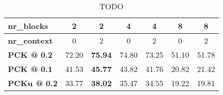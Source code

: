 \begin{table}[]
    \small
    \centering
    \caption{Per joint accuracy w.r.t. PCK @ 0.1, computed on the JHMDB test set using $4$ prediction blocks and $0$ context heatmaps. In addition, aggregated accuracy values are given in the third row for different sets of joints. \textit{Arms} for both left and right are computed by taking the average of the shoulder, elbow and wrist accuracies. \textit{Legs} are computed the same way, using knee, ankle and hip accuracy values. For \textit{Upper body}, upper neck and head top are added to both \textit{Arms} aggregations. \textit{Lower body} is computed by aggregating both \textit{legs} accuracies as well as pelvis.}
    \label{tab:jhmdb-perjoint}
\end{table}

\begin{table}[]
    \small
    \centering
    \begin{tabular}{|l|c|c|c|c|c|c|}
    \hline
        \textbf{nr\_blocks} & 2 & 2 & 4 & 4 & 8 & 8 \\ \hline
        \textbf{nr\_context} & 0 & 2 & 0 & 2 & 0 & 2 \\ \hline
        \textbf{PCK @ 0.2} & 72.20 & \textbf{75.94} & 74.80 & 73.25 & 51.10 & 51.78 \\ \hline
        \textbf{PCK @ 0.1} & 41.53 & \textbf{45.77} & 43.82 & 41.76 & 20.82 & 21.42 \\ \hline
        \textbf{PCKu @ 0.2} & 33.77 & \textbf{38.02} & 35.47 & 34.55 & 19.22 & 19.81 \\ \hline
    \end{tabular}
    \caption{TODO}
    \label{tab:jhmdb_results_estimated}
\end{table}


